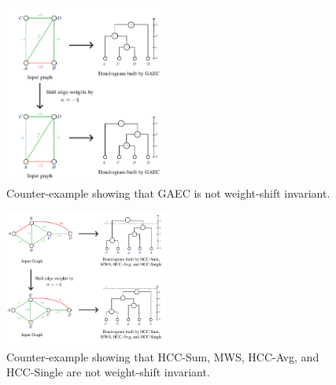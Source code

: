 \begin{figure}[t]
\centering
\includegraphics[width=0.48\textwidth,trim=0in 0in 0in 0in,clip]{./figs/counter-examples/counter-example-GAEC.pdf}

        \caption{ Counter-example showing that GAEC is not weight-shift invariant.
        } \label{fig:counter_examples_shift_inv_GAEC}
\end{figure}
\begin{figure}[t!]
\centering
\includegraphics[width=0.48\textwidth,trim=0in 0in 0in 0in,clip]{./figs/counter-examples/counter-example.pdf}

        \caption{ Counter-example showing that HCC-Sum, MWS, HCC-Avg, and HCC-Single are not weight-shift invariant.
        } \label{fig:counter_examples_shift_inv}
\end{figure}





